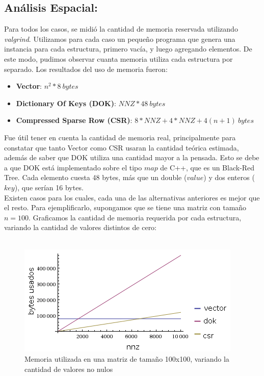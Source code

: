 \subsection{Análisis Espacial:}
Para todos los casos, se midió la cantidad de memoria reservada utilizando \textit{valgrind}. Utilizamos para cada caso un pequeño programa que genera una instancia para cada estructura, primero vacía, y luego agregando elementos. De este modo, pudimos observar cuanta memoria utiliza cada estructura por separado. Los resultados del uso de memoria fueron:\\

\begin{itemize}
	\item \textbf{Vector}: $n^2 * 8\ bytes$
	\item \textbf{Dictionary Of Keys (DOK)}: $NNZ * 48\ bytes$
	\item \textbf{Compressed Sparse Row (CSR)}: $8*NNZ + 4*NNZ + 4 (n+1)\ bytes$
\end{itemize}

Fue útil tener en cuenta la cantidad de memoria real, principalmente para constatar que tanto Vector como CSR usaran la cantidad teórica estimada, además de saber que DOK utiliza una cantidad mayor a la pensada. Esto se debe a que DOK está implementado sobre el tipo $map$ de C++, que es un Black-Red Tree. Cada elemento cuesta 48 bytes, más que un double ($value$) y dos enteros ($key$), que serían 16 bytes.  \\

Existen casos para los cuales, cada una de las alternativas anteriores es mejor que el resto. Para ejemplificarlo, supongamos que se tiene una matriz con tamaño $n=100$. Graficamos la cantidad de memoria requerida por cada estructura, variando la cantidad de valores distintos de cero: \\ \\

\begin{figure}
  \vspace{-20pt}
  \begin{center}
    \includegraphics[scale= 0.6]{imagenes/n100espacio.png}
  \end{center}
  \vspace{-20pt}
   \caption[Caption espacio n 100]{Memoria utilizada en una matriz de tamaño 100x100, variando la cantidad de valores no nulos}
  \vspace{-10pt}
  \label{fig:img11}
\end{figure}

